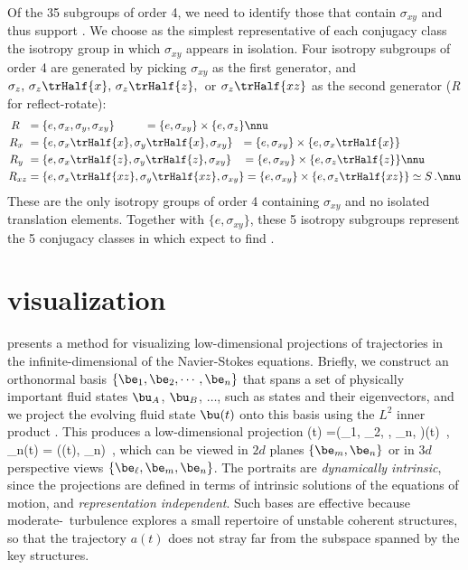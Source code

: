 Of the 35 subgroups of order 4, we need to identify those that
contain $\sigma_{xy}$ and thus support {\eqva}. We choose
as the simplest representative of each conjugacy class the isotropy
group in which $\sigma_{xy}$ appears in isolation.
Four isotropy subgroups of order 4 are generated by picking
$\sigma_{xy}$ as the first generator, and $\sigma_{z},\, \sigma_{z}
\trHalf{x},\, \sigma_{z} \trHalf{z},\,$ or $\sigma_{z} \trHalf{xz}$
as the second generator (\emph{R} for reflect-rotate):
\begin{align}
 R~~  &=  \{e, \sigma_x, \sigma_y, \sigma_{xy}\}
      ~~~~~~~\; = \{e,\sigma_{xy}\} \times \{e,\sigma_{z}\} \nnu\\
 R_x~ &=  \{e,\sigma_x \trHalf{x}, \sigma_y \trHalf{x}, \sigma_{xy}\}
      ~~ = \{e,\sigma_{xy}\} \times \{e,\sigma_{x}\trHalf{x}\}
        \label{subg4RR} \\
 R_y~ &=  \{e, \sigma_x \trHalf{z}, \sigma_y \trHalf{z}, \sigma_{xy}\}
      ~~\; = \{e,\sigma_{xy}\} \times \{e,\sigma_{z}\trHalf{z}\}
        \nnu\\
 R_{xz} &= \{e, \sigma_x \trHalf{xz}, \sigma_y \trHalf{xz}, \sigma_{xy}\}
        = \{e,\sigma_{xy}\} \times \{e,\sigma_{z}\trHalf{xz}\}
        \simeq S \,. \nnu
\end{align}
These are the only isotropy groups of order 4 containing $\sigma_{xy}$
and no isolated translation elements. Together with $\{e,\sigma_{xy}\}$,
these 5 isotropy subgroups represent the 5 conjugacy classes in
which expect to find {\eqva}.


\section{{\StateDsp} visualization}
\label{s:KFvisualStatSp}

 presents a method for visualizing low-dimensional
projections of trajectories in the infinite-dimensional {\statesp} of the
Navier-Stokes equations. Briefly, we construct an orthonormal basis
$\{\be_1, \be_2, \cdots, \be_n\}$ that spans a set of physically
important fluid states $\bu_A$, $\bu_B$, $\dots$, such as {\eqv} states
and their eigenvectors, and we project the evolving fluid state $\bu(t)$
onto this basis using the $L^2$ inner product . This
produces a low-dimensional projection
\beq
\ssp(t) =(\ssp_1, \ssp_2, \cdots, \ssp_n, \cdots)(t)
    \,,\qquad
\ssp_n(t) = (\bu(t), \be_n)
\,,
which can be viewed in $2d$ planes $\{\be_m, \be_n\}$ or in $3d$
perspective views $\{\be_{\ell},\be_m, \be_n\}$. The {\stateDsp}
portraits are {\em dynamically intrinsic}, since the projections are
defined in terms of intrinsic solutions of the equations of motion, and
{\em representation independent}. Such bases are
effective because moderate-\Reynolds\ turbulence explores a small
repertoire of unstable coherent structures, so that the trajectory $a(t)$
does not stray far from the subspace spanned by the key structures.

